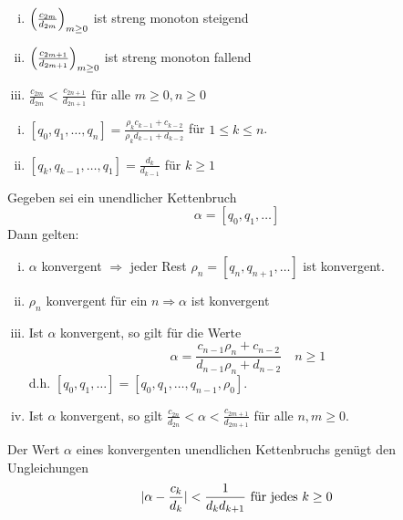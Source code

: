 \begin{falko} \label{F2.8}
	\begin{enumerate}[(i)]
		\item $\enbrace*{ \frac{c_{2m}}{d_{2m}}}_{m \geq 0}$ ist streng monoton steigend
		\item $\enbrace*{ \frac{c_{2m+1}}{d_{2m+1}}}_{m \geq 0}$ ist streng monoton fallend
		\item $\frac{c_{2m}}{d_{2m}} < \frac{c_{2n+1}}{d_{2n+1}}$ für alle $m \geq 0, n \geq 0$
	\end{enumerate}
\end{falko}

\begin{falko} \label{F2.9}
	\begin{enumerate}[(i)]
		\item $[q_0,q_1,\dots,q_n] = \frac{\rho_k c_{k-1} + c_{k-2}}{\rho_k d_{k-1} + d_{k-2}}$ für $1 \leq k \leq n$.
		\item $[q_k,q_{k-1}, \dots, q_1] = \frac{d_k}{d_{k-1}}$ für $k \geq 1$
	\end{enumerate}
\end{falko}

\begin{falko} \label{F2.10}
	Gegeben sei ein unendlicher Kettenbruch
	\begin{equation}
		\alpha = [q_0,q_1,\dots] \label{eq_2.24}
	\end{equation}
	Dann gelten: \begin{enumerate}[(i)]
		\item $\alpha$ konvergent $\Rightarrow$ jeder Rest $\rho_n = [q_n, q_{n+1}, \dots]$ ist konvergent.
		\item $\rho_n$ konvergent für ein $n \Rightarrow \alpha$ ist konvergent
		\item Ist $\alpha$ konvergent, so gilt für die Werte
		\begin{equation}
			\alpha = \frac{c_{n-1} \rho_n + c_{n-2}}{d_{n-1} \rho_n + d_{n-2}} \quad n \geq 1 \label{eq_F2.10}
		\end{equation}
		d.h. $[q_0,q_1,\dots] = [q_0, q_1, \dots, q_{n-1}, \rho_0]$.
		\item Ist $\alpha$ konvergent, so gilt $\frac{c_{2n}}{d_{2n}} < \alpha < \frac{c_{2m+1}}{d_{2m+1}}$ für alle $n,m \geq 0$.
	\end{enumerate}
\end{falko}

\begin{falko} \label{F2.11}
	Der Wert $\alpha$ eines konvergenten unendlichen Kettenbruchs genügt den Ungleichungen
	\begin{equation}
		\abs{\alpha - \frac{c_k}{d_k}} < \frac{1}{d_k d_{k+1}} \text{ für jedes } k \geq 0 \label{eq_2.26}
	\end{equation}
\end{falko}


